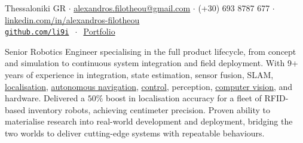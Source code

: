 \documentclass[a4paper,10pt,twoside]{article}
\begin{document}

\par{\bigskip\par}

\begin{center}
\vspace{-0.5em}
  {\small Thessaloniki GR $\cdot$ \href{mailto:alexandros.filotheou@gmail.com}{alexandros.filotheou@gmail.com} $\cdot$ (+30) 693 8787 677 $\cdot$ \href{https://www.linkedin.com/in/alexandros-filotheou-5b6a8676/}{linkedin.com/in/alexandros-filotheou} \\
  \href{https://github.com/li9i/}{\texttt{github.com/li9i}} $\ \cdot\ $ \href{https://mozilla.github.io/pdf.js/web/viewer.html?file=https://raw.githubusercontent.com/li9i/portfolio/master/portfolio.pdf}{Portfolio}}
\end{center}\vspace{2em}

\vspace{-3em}
\begin{bw_box} \small
Senior Robotics Engineer specialising in the full product lifecycle, from concept and simulation to continuous system integration and field deployment. With 9+ years of experience in integration, state estimation, sensor fusion, SLAM, \href{https://github.com/li9i/fsm-lo}{localisation}, \href{https://link.springer.com/article/10.1007/s10846-019-01086-y}{autonomous navigation}, \href{https://www.tandfonline.com/doi/full/10.1080/00207179.2018.1514129}{control}, perception, \href{https://github.com/li9i/pandora\_vision\_2014}{computer vision}, and hardware. Delivered a $50\%$ boost in localisation accuracy for a fleet of RFID-based inventory robots, achieving centimeter precision. Proven ability to materialise research into real-world development and deployment, bridging the two worlds to deliver cutting-edge systems with repeatable behaviours.
\end{bw_box}

\end{document}
